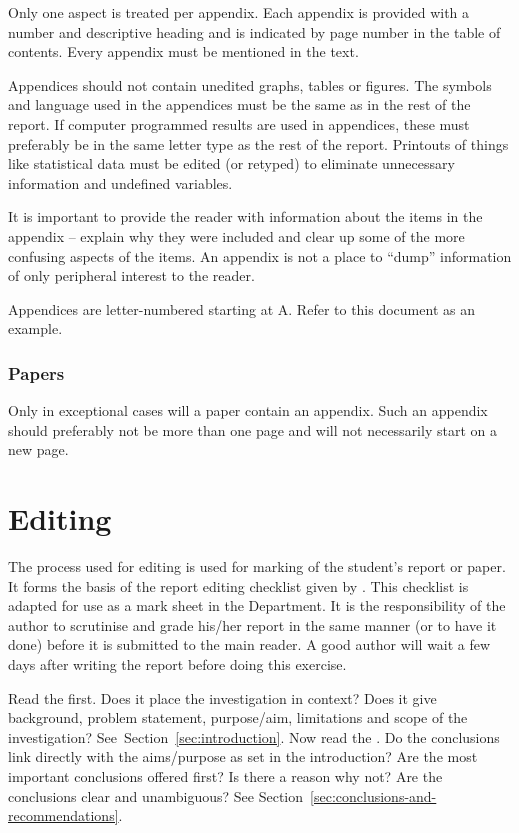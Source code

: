\documentclass[a5paper, 10pt]{article}
\begin{document}
Only one aspect is treated per appendix.  Each appendix is provided
with a number and descriptive heading and is indicated by page number
in the table of contents.  Every appendix must be mentioned in the
text.

Appendices should not contain unedited graphs, tables or figures.  The
symbols and language used in the appendices must be the same as in the
rest of the report.  If computer programmed results are used in
appendices, these must preferably be in the same letter type as the
rest of the report.  Printouts of things like statistical data must be
edited (or retyped) to eliminate unnecessary information and undefined
variables.

It is important to provide the reader with information about the items
in the appendix -- explain why they were included and clear up some of
the more confusing aspects of the items.  An appendix is not a place
to ``dump'' information of only peripheral interest to the reader.

Appendices are letter-numbered starting at A. Refer to this document as an example.

\subsubsection{Papers}
Only in exceptional cases will a paper contain an appendix.  Such an
appendix should preferably not be more than one page and will not
necessarily start on a new page.

\section{Editing}
\label{cha:editing}
The process used for editing is used for marking of the student's
report or paper.  It forms the basis of the report editing checklist
given by \citet[176]{bruckmanmandersloot}.  This checklist is adapted
for use as a mark sheet in the Department.  It is the responsibility
of the author to scrutinise and grade his/her report in the same
manner (or to have it done) before it is submitted to the main reader.
A good author will wait a few days after writing the report before
doing this exercise.

Read the  first.  Does it place the
investigation in context? Does it give background, problem
statement, purpose/aim, limitations and scope of the investigation?
See~Section~\ref{sec:introduction}.  Now read the
.  Do the conclusions link directly with the
aims/purpose as set in the introduction?  Are the most important
conclusions offered first?  Is there a reason why not?  Are the
conclusions clear and unambiguous?  See
Section~\ref{sec:conclusions-and-recommendations}.
\end{document}
